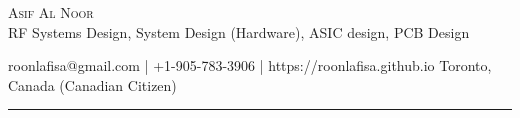 \documentclass[10pt,A4]{article}
\newcommand{\metasection}[2]
{
\footnotesize{#2} \hspace*{\fill} \footnotesize{#1}\\[1pt]
}
\begin{document}
\pagestyle{fancy}	








\vspace{-8pt}
\begin{center}
	\HUGE \textsc{Asif Al Noor} \\[2pt]
	\small RF Systems Design, System Design (Hardware), ASIC design, PCB Design
\end{center}



\vspace{6pt}


\vspace{-10pt}
\metasection{Toronto, Canada (Canadian Citizen)}{roonlafisa@gmail.com | +1-905-783-3906 | https://roonlafisa.github.io}
\vspace{-6pt}
\textcolor{softcol}{\hrule}


\normalsize

\end{document}
